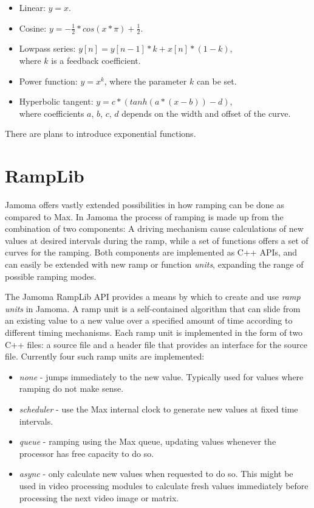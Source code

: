 \documentclass{article}
\begin{document}
\begin{itemize}
	\item Linear: $y = x$.
	\item Cosine: $y = - \frac{1}{2} * cos(x * \pi ) + \frac{1}{2} $.
	\item Lowpass series: $y[n] = y[n-1] * k + x[n] * (1-k)$, \\ where $k$ is a feedback coefficient.
	\item Power function: $ y = x^{k} $, where the parameter $k$ can be set.
	\item Hyperbolic tangent: $ y = c * (tanh(a*(x-b)) - d) $, \\ where coefficients $a$, $b$, $c$, $d$ depends on the width and offset of the curve.
\end{itemize}

There are plans to introduce exponential functions.



\section{RampLib}\label{sec:ramplib}

Jamoma offers vastly extended possibilities in how ramping can be done as compared to Max. In Jamoma the process of ramping is made up from the combination of two components: A driving mechanism cause calculations of new values at desired intervals during the ramp, while a set of functions offers a set of curves for the ramping. Both components are implemented as C++ APIs, and can easily be extended with new ramp or function \emph{units}, expanding the range of possible ramping modes.

The Jamoma RampLib API provides a means by which to create and use \emph{ramp units} in Jamoma.  A ramp unit is a self-contained algorithm that can slide from an existing value to a new value over a specified amount of time according to different timing mechanisms. Each ramp unit is implemented in the form of two C++ files: a source file and a header file that provides an interface for the source file. Currently four such ramp units are implemented:

\begin{itemize}
	\item \emph{none} - jumps immediately to the new value. Typically used for values where ramping do not make sense.
	\item \emph{scheduler} - use the Max internal clock to generate new values at fixed time intervals.
	\item \emph{queue} - ramping using the Max queue, updating values whenever the processor has free capacity to do so.
	\item \emph{async} - only calculate new values when requested to do so. This might be used in video processing modules to calculate fresh values immediately before processing the next video image or matrix.
\end{itemize}
\end{document}
